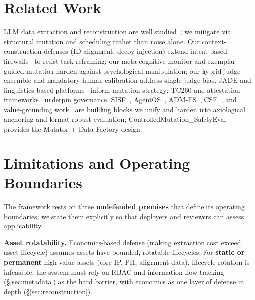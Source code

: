 \documentclass[letterpaper,twocolumn,10pt]{article}
\begin{document}
\section{Related Work}

LLM data extraction and reconstruction are well studied~\cite{llm-reconstruction-emergent,split-ft-attack,active-reconstruction}; we mitigate via structural mutation and scheduling rather than noise alone. Our context-construction defenses (ID alignment, decoy injection) extend intent-based firewalls~\cite{agentos-arxiv} to resist task reframing; our meta-cognitive monitor and exemplar-guided mutation harden against psychological manipulation; our hybrid judge ensemble and mandatory human calibration address single-judge bias. JADE and linguistics-based platforms~\cite{jade-linguistics,jade-db} inform mutation strategy; TC260 and attestation frameworks~\cite{tc260-governance,tc260-training-data,dual-use-attestations} underpin governance. SISF~\cite{sisf-arxiv}, AgentOS~\cite{agentos-arxiv}, ADM-ES~\cite{adm-es-arxiv}, CSE~\cite{cse-arxiv}, and value-grounding work~\cite{epistemic-grounding,hpm-jailbreak} are building blocks we unify and harden into axiological anchoring and format-robust evaluation; ControlledMutation\_SafetyEval~\cite{ControlledMutation_SafetyEval} provides the Mutator + Data Factory design.

\section{Limitations and Operating Boundaries}

The framework rests on three \textbf{undefended premises} that define its operating boundaries; we state them explicitly so that deployers and reviewers can assess applicability.

\textbf{Asset rotatability.} Economics-based defense (making extraction cost exceed asset lifecycle) assumes assets have bounded, rotatable lifecycles. For \textbf{static or permanent} high-value assets (core IP, PII, alignment data), lifecycle rotation is infeasible; the system must rely on RBAC and information flow tracking (\S\ref{sec:metadata}) as the hard barrier, with economics as one layer of defense in depth (\S\ref{sec:reconstruction}).
\end{document}
